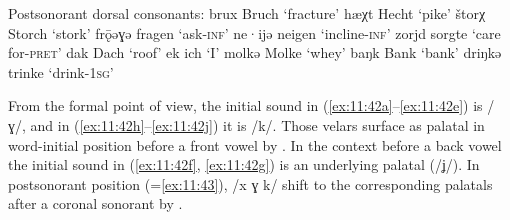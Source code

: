 \ea%
\label{ex:11:43}Postsonorant dorsal consonants:
\ea\label{ex:11:43a}  brux    \tab  [brʊx]    \tab Bruch   \tab ‘fracture’               
\ex\label{ex:11:43b}  hæχt    \tab  [hæçt]    \tab Hecht   \tab ‘pike’                   
\ex\label{ex:11:43c}  štorχ   \tab  [ʃtɔrç]   \tab Storch  \tab ‘stork’                  
\ex\label{ex:11:43d}  frǭəɣə  \tab  [frɔːəɣə] \tab fragen  \tab ‘ask-\textsc{inf}’       
\ex\label{ex:11:43e}  ne·ijə  \tab  [neiʝə]   \tab neigen  \tab ‘incline-\textsc{inf}’   
\ex\label{ex:11:43f}  zorjd   \tab  [zɔrʝd]   \tab sorgte  \tab ‘care for-\textsc{pret}’ 
\ex\label{ex:11:43g}  dak     \tab  [dɑk]     \tab Dach    \tab ‘roof’               
\ex\label{ex:11:43h}  ek      \tab  [ɛc]      \tab ich     \tab ‘I’                  
\ex\label{ex:11:43i}  molkə   \tab  [mɔlcə]   \tab Molke   \tab ‘whey’               
\ex\label{ex:11:43j}  baŋk    \tab  [bɑŋk]    \tab Bank    \tab ‘bank’               
\ex\label{ex:11:43k}  driŋkə  \tab  [drɪɲcə]  \tab trinke  \tab ‘drink-\textsc{1sg}’ 
\z 
\z 

From the formal point of view, the initial sound in (\ref{ex:11:42a}--\ref{ex:11:42e}) is /ɣ/, and in (\ref{ex:11:42h}--\ref{ex:11:42j}) it is /k/. Those velars surface as palatal in word-initial position before a front vowel by . In the context before a back vowel the initial sound in (\ref{ex:11:42f}, \ref{ex:11:42g}) is an underlying palatal (/ʝ/). In postsonorant position (=\ref{ex:11:43}), /x ɣ k/ shift to the corresponding palatals after a coronal sonorant by . 

